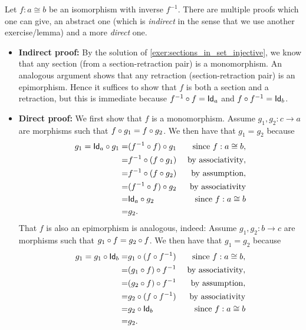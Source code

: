 \begin{solution}\label{sol:iso_to_monoepi}
Let $f : a\cong b$ be an isomorphism with inverse $f^{-1}$. There are multiple proofs which one can give, an abstract one (which is \textit{indirect} in the sense that we use another exercise/lemma) and a more \textit{direct} one.
\begin{itemize}
\item \textbf{Indirect proof:} By the solution of \ref{exer:sections_in_set_injective}, we know that any section (from a section-retraction pair) is a monomorphism. An analogous argument shows that any retraction (section-retraction pair) is an epimorphism. Hence it suffices to show that $f$ is both a section and a retraction, but this is immediate because $\co{f}{f^{-1}} = \Id[a]$ and $\co{f^{-1}}{f} = \Id[b]$.
\item \textbf{Direct proof:} We first show that $f$ is a monomorphism. Assume $g_1,g_2 : c\to a$ are morphisms such that $\co{g_1}{f} = \co{g_2}{f}$. We then have that $g_1 = g_2$ because 
\begin{eqnarray*}
g_1 = \co{g_1}{\Id[a]} =& \co{g_1}{(\co{f}{f^{-1}})} & \text{ since $f : a\cong b$},\\ 
	=& \co{(\co{g_1}{f})}{f^{-1}} & \text{ by associativity}, \\ 
	=& \co{(\co{g_2}{f})}{f^{-1}} & \text{ by assumption}, \\
	=& \co{g_2}{(\co{f}{f^{-1}})} & \text{ by associativity} \\
	=& \co{g_2}{\Id[a]} & \text{ since $f : a\cong b$} \\
	=& g_2.
\end{eqnarray*}
That $f$ is also an epimorphism is analogous, indeed: Assume $g_1,g_2 : b\to c$ are morphisms such that $\co{f}{g_1} = \co{f}{g_2}$. We then have that $g_1 = g_2$ because 
\begin{eqnarray*}
g_1 = \co{\Id[b]}{g_1} =& \co{(\co{f^{-1}}{f})}{g_1} & \text{ since $f : a\cong b$},\\ 
	=& \co{f^{-1}}{(\co{f}{g_1})} & \text{ by associativity}, \\ 
	=& \co{f^{-1}}{(\co{f}{g_2})} & \text{ by assumption}, \\
	=& \co{(\co{f^{-1}}{f})}{g_2} & \text{ by associativity} \\
	=& \co{\Id[b]}{g_2} & \text{ since $f : a\cong b$} \\
	=& g_2.
\end{eqnarray*}
\end{itemize}
\end{solution}

